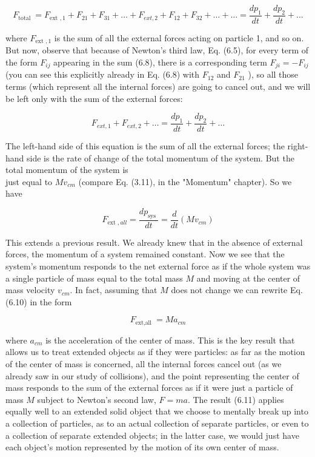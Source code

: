 \documentclass[10pt]{article}
\begin{document}
\begin{equation*}
F_{\text {total }}=F_{\text {ext }, 1}+F_{21}+F_{31}+\ldots+F_{e x t, 2}+F_{12}+F_{32}+\ldots+\ldots=\frac{d p_{1}}{d t}+\frac{d p_{2}}{d t}+\ldots \tag{6.8}
\end{equation*}


where $F_{\text {ext }, 1}$ is the sum of all the external forces acting on particle 1, and so on. But now, observe that because of Newton's third law, Eq. (6.5), for every term of the form $F_{i j}$ appearing in the sum (6.8), there is a corresponding term $F_{j i}=-F_{i j}$ (you can see this explicitly already in Eq. (6.8) with $F_{12}$ and $F_{21}$ ), so all those terms (which represent all the internal forces) are going to cancel out, and we will be left only with the sum of the external forces:


\begin{equation*}
F_{e x t, 1}+F_{e x t, 2}+\ldots=\frac{d p_{1}}{d t}+\frac{d p_{2}}{d t}+\ldots \tag{6.9}
\end{equation*}


The left-hand side of this equation is the sum of all the external forces; the right-hand side is the rate of change of the total momentum of the system. But the total momentum of the system is\\
just equal to $M v_{c m}$ (compare Eq. (3.11), in the "Momentum" chapter). So we have


\begin{equation*}
F_{\text {ext }, a l l}=\frac{d p_{\text {sys }}}{d t}=\frac{d}{d t}\left(M v_{c m}\right) \tag{6.10}
\end{equation*}


This extends a previous result. We already knew that in the absence of external forces, the momentum of a system remained constant. Now we see that the system's momentum responds to the net external force as if the whole system was a single particle of mass equal to the total mass $M$ and moving at the center of mass velocity $v_{c m}$. In fact, assuming that $M$ does not change we can rewrite Eq. (6.10) in the form


\begin{equation*}
F_{\text {ext,all }}=M a_{c m} \tag{6.11}
\end{equation*}


where $a_{c m}$ is the acceleration of the center of mass. This is the key result that allows us to treat extended objects as if they were particles: as far as the motion of the center of mass is concerned, all the internal forces cancel out (as we already saw in our study of collisions), and the point representing the center of mass responds to the sum of the external forces as if it were just a particle of mass $M$ subject to Newton's second law, $F=m a$. The result (6.11) applies equally well to an extended solid object that we choose to mentally break up into a collection of particles, as to an actual collection of separate particles, or even to a collection of separate extended objects; in the latter case, we would just have each object's motion represented by the motion of its own center of mass.
\end{document}

